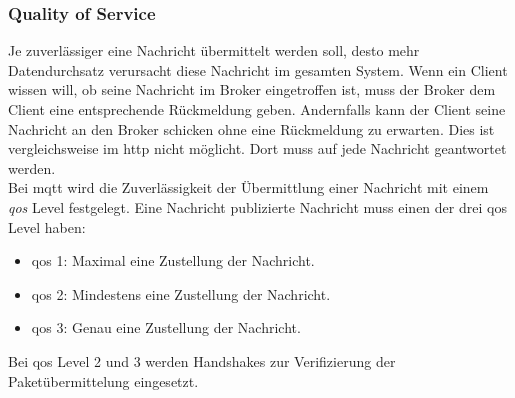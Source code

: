 \subsubsection{Quality of Service}
Je zuverlässiger eine Nachricht übermittelt werden soll, desto mehr Datendurchsatz verursacht diese Nachricht im gesamten System. Wenn ein Client wissen will, ob seine Nachricht im Broker eingetroffen ist, muss der Broker dem Client eine entsprechende Rückmeldung geben. Andernfalls kann der Client seine Nachricht an den Broker schicken ohne eine Rückmeldung zu erwarten. Dies ist vergleichsweise im \ac{http} nicht möglicht. Dort muss auf jede Nachricht geantwortet werden.\\
Bei \ac{mqtt} wird die Zuverlässigkeit der Übermittlung einer Nachricht mit einem \textit{\acf{qos}} Level festgelegt. Eine Nachricht publizierte Nachricht muss einen der drei \ac{qos} Level haben:
\begin{itemize}
    \item \ac{qos} 1: Maximal eine Zustellung der Nachricht.
    \item \ac{qos} 2: Mindestens eine Zustellung der Nachricht.
    \item \ac{qos} 3: Genau eine Zustellung der Nachricht.
\end{itemize}
Bei \ac{qos} Level 2 und 3 werden Handshakes zur Verifizierung der Paketübermittelung eingesetzt.\cite{mqtt5Specification}

